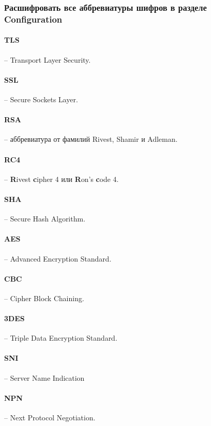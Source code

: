 \subsubsection{Расшифровать все аббревиатуры шифров в разделе Configuration}

\paragraph{TLS} -- Transport Layer Security.

\paragraph{SSL} -- Secure Sockets Layer.

\paragraph{RSA} -- аббревиатура от фамилий Rivest, Shamir и Adleman.

\paragraph{RC4} -- \textbf{R}ivest \textbf{c}ipher 4 или \textbf{R}on’s \textbf{c}ode 4.

\paragraph{SHA} -- Secure Hash Algorithm.

\paragraph{AES} -- Advanced Encryption Standard.

\paragraph{CBC} -- Cipher Block Chaining.

\paragraph{3DES} -- Triple Data Encryption Standard.

\paragraph{SNI} -- Server Name Indication

\paragraph{NPN} -- Next Protocol Negotiation.

